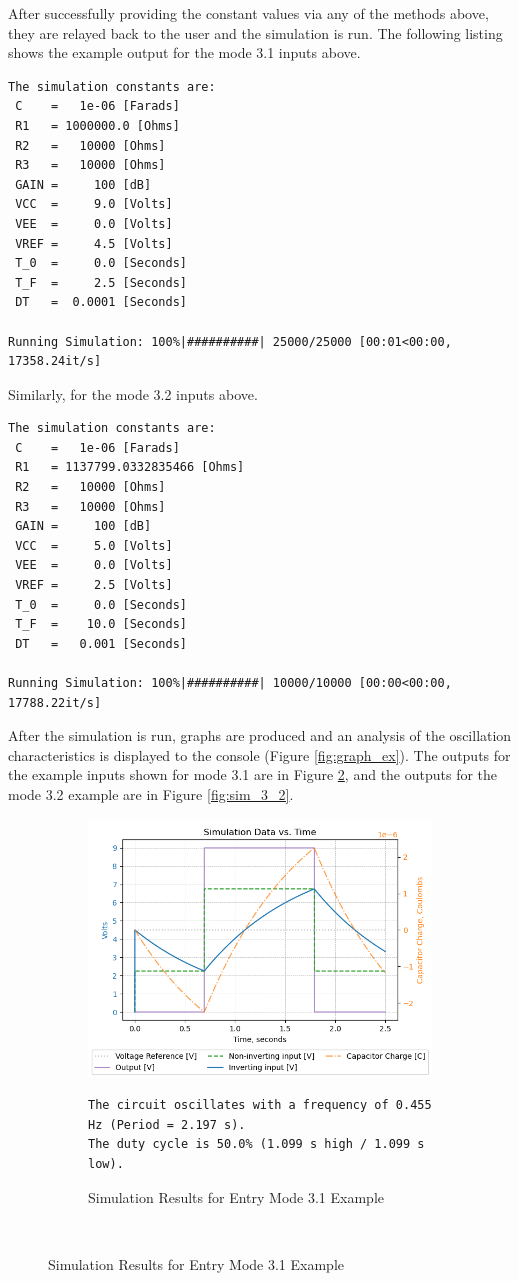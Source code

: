 \documentclass[12pt]{article}
\begin{document}
\begin{appendix}
After successfully providing the constant values via any of the methods above, they are relayed back to the user and the simulation is run. The following listing shows the example output for the mode 3.1 inputs above.
\clearpage
\begin{lstlisting}[basicstyle=\ttfamily,frame=tb,breaklines=true]
The simulation constants are:
 C    =   1e-06 [Farads]
 R1   = 1000000.0 [Ohms]
 R2   =   10000 [Ohms]
 R3   =   10000 [Ohms]
 GAIN =     100 [dB]
 VCC  =     9.0 [Volts]
 VEE  =     0.0 [Volts]
 VREF =     4.5 [Volts]
 T_0  =     0.0 [Seconds]
 T_F  =     2.5 [Seconds]
 DT   =  0.0001 [Seconds]

Running Simulation: 100%|##########| 25000/25000 [00:01<00:00, 17358.24it/s]
\end{lstlisting}
Similarly, for the mode 3.2 inputs above.
\begin{lstlisting}[basicstyle=\ttfamily,frame=tb,breaklines=true]
The simulation constants are:
 C    =   1e-06 [Farads]
 R1   = 1137799.0332835466 [Ohms]
 R2   =   10000 [Ohms]
 R3   =   10000 [Ohms]
 GAIN =     100 [dB]
 VCC  =     5.0 [Volts]
 VEE  =     0.0 [Volts]
 VREF =     2.5 [Volts]
 T_0  =     0.0 [Seconds]
 T_F  =    10.0 [Seconds]
 DT   =   0.001 [Seconds]

Running Simulation: 100%|##########| 10000/10000 [00:00<00:00, 17788.22it/s]
\end{lstlisting}
After the simulation is run, graphs are produced and an analysis of the oscillation characteristics is displayed to the console (Figure \ref{fig:graph_ex}). The outputs for the example inputs shown for mode 3.1 are in Figure \ref{fig:sim_3_1}, and the outputs for the mode 3.2 example are in Figure \ref{fig:sim_3_2}.

\begin{figure}[h]
\centering
\begin{subfigure}{\textwidth}
    \centering
    \caption{Simulation Results for Entry Mode 3.1 Example}
    \label{fig:sim_3_1}
    \includegraphics[width=0.65\linewidth]{assets/Simulation_2.png}
\begin{lstlisting}[basicstyle=\ttfamily,frame=tb,breaklines=true]
The circuit oscillates with a frequency of 0.455 Hz (Period = 2.197 s).
The duty cycle is 50.0% (1.099 s high / 1.099 s low).
\end{lstlisting}
\end{subfigure}\\
    

\end{figure}
\end{appendix}
\end{document}
